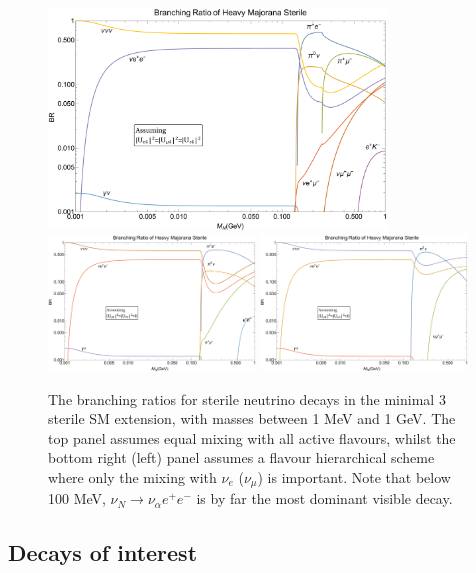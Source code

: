 \documentclass[11pt, a4paper]{article}
\begin{document}
\begin{figure}[t]
%
	\centering
\includegraphics[width=0.8\textwidth]{figures/bounds1.pdf}\\
\includegraphics[width=0.49\textwidth]{figures/bounds2.pdf}
\includegraphics[width=0.49\textwidth]{figures/bounds3.pdf}
%
\caption{\label{fig:branchingratios}The branching ratios for sterile neutrino
decays in the minimal 3 sterile SM extension, with masses between 1 MeV and 1 GeV. The top panel assumes equal
mixing with all active flavours, whilst the bottom right (left) panel assumes a flavour
hierarchical scheme where only the mixing with $\nu_e$ ($\nu_\mu$) is important. Note that below 100 MeV, $\nu_N \rightarrow \nu_\alpha e^+ e^-$ is by far the most dominant visible decay.}
%
\end{figure}

\subsection{Decays of interest}
\end{document}
